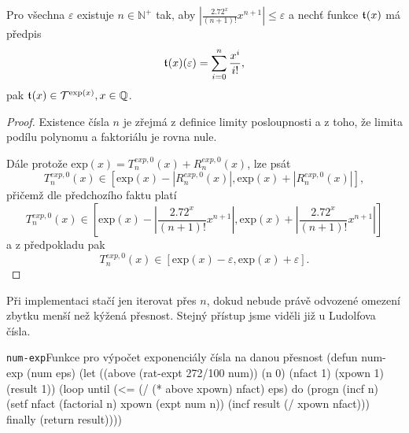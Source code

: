 \begin{consequence}
Pro všechna $\varepsilon$ existuje $n\in\mathbb{N}^+$ tak, aby $\left|\frac{2.72^x}{(n+1)!}x^{n+1}\right| \leq \varepsilon$ a nechť funkce $\mathfrak{t}^{}(x)$ má předpis
\begin{equation}
\mathfrak{t}^{}(x)(\varepsilon)=\sum_{i=0}^n \frac{x^i}{i!},
\end{equation}
pak $\mathfrak{t}^{}(x)\in\mathcal{T}^{\mathrm{exp}(x)},x\in\mathbb{Q}$.
\begin{proof}
Existence čísla $n$ je zřejmá z definice limity posloupnosti a z toho, že limita podílu polynomu a faktoriálu je rovna nule.

Dále protože $\mathrm{exp}(x) = T^{exp, 0}_n(x)+R^{exp, 0}_n(x)$, lze psát
\begin{equation}
T^{exp, 0}_n(x) \in [\mathrm{exp}(x) - |R^{exp, 0}_n(x)|, \mathrm{exp}(x) + |R^{exp, 0}_n(x)|],
\end{equation}
přičemž dle předchozího faktu platí
\begin{equation}
T^{exp, 0}_n(x) \in [\mathrm{exp}(x) - \left| \frac{2.72^x}{(n+1)!}x^{n+1} \right|, \mathrm{exp}(x) + \left| \frac{2.72^x}{(n+1)!}x^{n+1} \right|]
\end{equation}
a z předpokladu pak
\begin{equation}
T^{exp, 0}_n(x) \in [\mathrm{exp}(x) - \varepsilon, \mathrm{exp}(x) + \varepsilon].
\end{equation}
\end{proof}
\end{consequence}

Při implementaci stačí jen iterovat přes $n$, dokud nebude právě odvozené omezení zbytku menší než kýžená přesnost. Stejný přístup jsme viděli již u Ludolfova čísla.

\begin{lispcode}{\texttt{num-exp}}{Funkce pro výpočet exponenciály čísla na danou přesnost}
(\textcolor{funkcionalni}{defun} \textcolor{pojmenovan}{num-exp} (num eps)
  (\textcolor{vedlejsi}{let} ((above (\textcolor{moje}{rat-expt} 272/100 num)) (n 0)
        (nfact 1) (xpown 1) (result 1))
    (\textcolor{funkcionalni}{loop} 
     \textcolor{obarvi}{until} (\textcolor{matematicke}{<=} (\textcolor{matematicke}{/} (\textcolor{matematicke}{*} above xpown) nfact) eps)
     \textcolor{obarvi}{do} (progn
          (\textcolor{vedlejsi}{incf} n)
          (\textcolor{vedlejsi}{setf} nfact (\textcolor{moje}{factorial} n)
                xpown (\textcolor{matematicke}{expt} num n))
          (\textcolor{vedlejsi}{incf} result (\textcolor{matematicke}{/} xpown nfact)))
     \textcolor{obarvi}{finally} (\textcolor{funkcionalni}{return} result))))
\end{lispcode}

